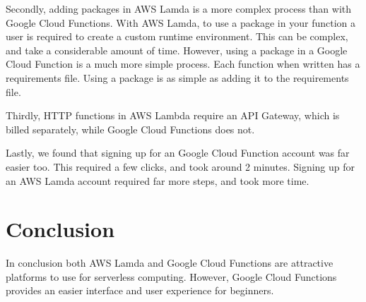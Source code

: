 \documentclass[10pt, conference]{IEEEtran}
\begin{document}
Secondly, adding packages in AWS Lamda is a more complex process than with Google Cloud Functions. With AWS Lamda, to use a package in your function a user is required to create a custom runtime environment. This can be complex, and take a considerable amount of time. However, using a package in a Google Cloud Function is a much more simple process. Each function when written has a requirements file. Using a package is as simple as adding it to the requirements file. 

Thirdly, HTTP functions in AWS Lambda require an API Gateway, which is billed separately, while Google Cloud Functions does not. 

Lastly, we found that signing up for an Google Cloud Function account was far easier too. This required a few clicks, and took around 2 minutes. Signing up for an AWS Lamda account required far more steps, and took more time. 

\section{Conclusion}

In conclusion both AWS Lamda and Google Cloud Functions are attractive platforms to use for serverless computing. However, Google Cloud Functions provides an easier interface and user experience for beginners. 
\end{document}
